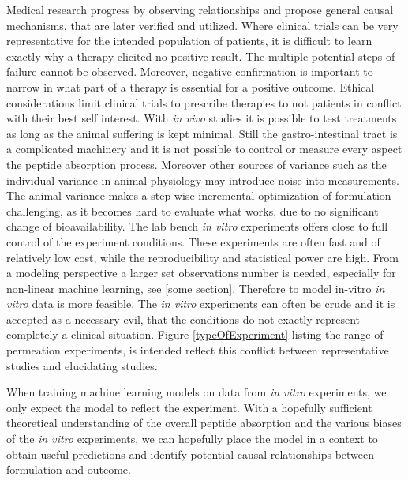 Medical research progress by observing relationships and propose general causal mechanisms, that are later verified and utilized. Where clinical trials can be very representative for the intended population of patients, it is difficult to learn exactly why a therapy elicited no positive result. The multiple potential steps of failure cannot be observed. Moreover, negative confirmation is important to narrow in what part of a therapy is essential for a positive outcome. Ethical considerations limit clinical trials to prescribe therapies to not patients in conflict with their best self interest. With \textit{in vivo} studies it is possible to test treatments as long as the animal suffering is kept minimal. Still the gastro-intestinal tract is a complicated machinery and it is not possible to control or measure every aspect the peptide absorption process. Moreover other sources of variance such as the individual variance in animal physiology may introduce noise into measurements. The animal variance makes a step-wise incremental optimization of formulation challenging, as it becomes hard to evaluate what works, due to no significant change of bioavailability. The lab bench \textit{in vitro} experiments offers close to full control of the experiment conditions. These experiments are often fast and of relatively low cost, while the reproducibility and statistical power are high. From a modeling perspective a larger set observations number is needed, especially for non-linear machine learning, see \ref{some section}. Therefore to model in-vitro \textit{in vitro} data is more feasible. The \textit{in vitro} experiments can often be crude and it is accepted as a necessary evil, that the conditions do not exactly represent completely a clinical situation. Figure \ref{typeOfExperiment} listing the range of permeation experiments, is intended reflect this conflict between representative studies and elucidating studies.

When training machine learning models on data from \textit{in vitro} experiments, we only expect the model to reflect the experiment. With a hopefully sufficient theoretical understanding of the overall peptide absorption and the various biases of the \textit{in vitro} experiments, we can hopefully place the model in a context to obtain useful predictions and identify potential causal relationships between formulation and outcome.

